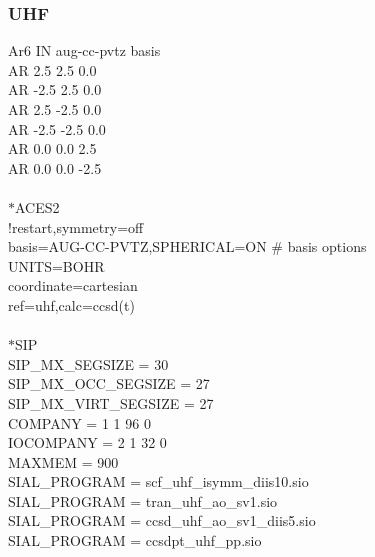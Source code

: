 \documentclass[12pt]{article}
\begin{document}
\subsubsection{UHF}
Ar6 IN aug-cc-pvtz basis\\ 
AR  2.5  2.5  0.0\\
AR -2.5  2.5  0.0\\
AR  2.5 -2.5  0.0\\
AR -2.5 -2.5  0.0\\
AR  0.0  0.0  2.5\\
AR  0.0  0.0 -2.5\\
\\
$*$ACES2\\ 
!restart,symmetry=off\\ 
basis=AUG-CC-PVTZ,SPHERICAL=ON \# basis options\\ 
UNITS=BOHR\\ 
coordinate=cartesian\\ 
ref=uhf,calc=ccsd(t)\\
\\
$*$SIP\\
SIP\_MX\_SEGSIZE      = 30\\
SIP\_MX\_OCC\_SEGSIZE  = 27\\
SIP\_MX\_VIRT\_SEGSIZE = 27\\
COMPANY   = 1 1 96 0\\
IOCOMPANY = 2 1 32 0\\ 
MAXMEM    = 900\\ 
SIAL\_PROGRAM = scf\_uhf\_isymm\_diis10.sio\\
SIAL\_PROGRAM = tran\_uhf\_ao\_sv1.sio\\
SIAL\_PROGRAM = ccsd\_uhf\_ao\_sv1\_diis5.sio\\ 
SIAL\_PROGRAM = ccsdpt\_uhf\_pp.sio\\ 


\newpage 

\noindent 
\end{document}

